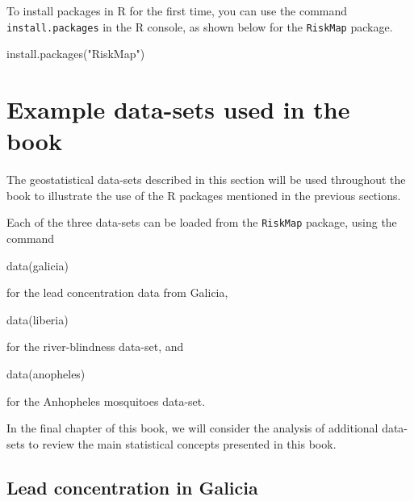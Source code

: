 \documentclass[
  letterpaper,
]{krantz}
\newenvironment{Shaded}{\begin{snugshade}}{\end{snugshade}}
\newcommand{\FunctionTok}[1]{\textcolor[rgb]{0.28,0.35,0.67}{#1}}
\newcommand{\NormalTok}[1]{\textcolor[rgb]{0.00,0.23,0.31}{#1}}
\newcommand{\StringTok}[1]{\textcolor[rgb]{0.13,0.47,0.30}{#1}}
\begin{document}
To install packages in R for the first time, you can use the command
\texttt{install.packages} in the R console, as shown below for the
\texttt{RiskMap} package.

\begin{Shaded}
\begin{Highlighting}[]
\FunctionTok{install.packages}\NormalTok{(}\StringTok{"RiskMap"}\NormalTok{)}
\end{Highlighting}
\end{Shaded}

\hypertarget{sec-examples-ch1}{%
\section{Example data-sets used in the book}\label{sec-examples-ch1}}

The geostatistical data-sets described in this section will be used
throughout the book to illustrate the use of the R packages mentioned in
the previous sections.

Each of the three data-sets can be loaded from the \texttt{RiskMap}
package, using the command

\begin{Shaded}
\begin{Highlighting}[]
\FunctionTok{data}\NormalTok{(galicia)}
\end{Highlighting}
\end{Shaded}

for the lead concentration data from Galicia,

\begin{Shaded}
\begin{Highlighting}[]
\FunctionTok{data}\NormalTok{(liberia)}
\end{Highlighting}
\end{Shaded}

for the river-blindness data-set, and

\begin{Shaded}
\begin{Highlighting}[]
\FunctionTok{data}\NormalTok{(anopheles)}
\end{Highlighting}
\end{Shaded}

for the Anhopheles mosquitoes data-set.

In the final chapter of this book, we will consider the analysis of
additional data-sets to review the main statistical concepts presented
in this book.

\hypertarget{lead-concentration-in-galicia}{%
\subsection{Lead concentration in
Galicia}\label{lead-concentration-in-galicia}}
\end{document}
